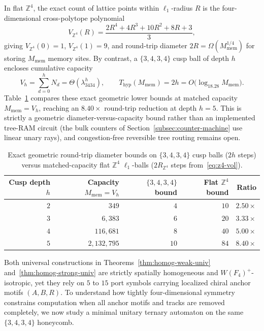 In flat $\mathbb{Z}^4$, the exact count of lattice points within $\ell_1$-radius $R$ is the four-dimensional cross-polytope polynomial
\begin{equation}
\label{eq:z4-vol}
V_{\mathbb{Z}^4}(R) = \frac{2R^4 + 4R^3 + 10R^2 + 8R + 3}{3},
\end{equation}
giving $V_{\mathbb{Z}^4}(0) = 1$, $V_{\mathbb{Z}^4}(1) = 9$, and round-trip diameter $2R = \Omega(M_{\mathrm{mem}}^{1/4})$ for storing $M_{\mathrm{mem}}$ memory sites. By contrast, a $\{3,4,3,4\}$ cusp ball of depth $h$ encloses cumulative capacity
\begin{equation}
\label{eq:cusp-cap}
V_h = \sum_{d=0}^{h} N_d = \Theta(\lambda_{3434}^{h}), \qquad T_{\mathrm{hyp}}(M_{\mathrm{mem}}) = 2h = O\bigl(\log_{18.28} M_{\mathrm{mem}}\bigr).
\end{equation}
Table~\ref{tab:ram-speedup} compares these exact geometric lower bounds at matched capacity $M_{\mathrm{mem}} = V_h$, reaching an $8.40\times$ round-trip reduction at depth $h = 5$. This is strictly a geometric diameter-versus-capacity bound rather than an implemented tree-RAM circuit (the bulk counters of Section~\ref{subsec:counter-machine} use linear unary rays), and congestion-free reversible tree routing remains open.

\begin{table}[tb]
\centering
\caption{Exact geometric round-trip diameter bounds on $\{3,4,3,4\}$ cusp balls ($2h$ steps) versus matched-capacity flat $\mathbb{Z}^4$ $\ell_1$-balls ($2R_{\mathbb{Z}^4}$ steps from~\eqref{eq:z4-vol}).}
\label{tab:ram-speedup}
\small
\begin{tabular}{@{}rrrrr@{}}
\toprule
Cusp depth $h$ & Capacity $M_{\mathrm{mem}} = V_h$ & $\{3,4,3,4\}$ bound & Flat $\mathbb{Z}^4$ bound & Ratio \\
\midrule
$2$ & $349$ & $4$ & $10$ & $2.50\times$ \\
$3$ & $6{,}383$ & $6$ & $20$ & $3.33\times$ \\
$4$ & $116{,}681$ & $8$ & $40$ & $5.00\times$ \\
$5$ & $2{,}132{,}795$ & $10$ & $84$ & $8.40\times$ \\
\bottomrule
\end{tabular}
\end{table}

Both universal constructions in Theorems~\ref{thm:homog-weak-univ} and~\ref{thm:homog-strong-univ} are strictly spatially homogeneous and $W(F_4)^+$-isotropic, yet they rely on $5$ to $15$ port symbols carrying localized chiral anchor motifs $(A, B, R)$. To understand how tightly four-dimensional symmetry constrains computation when all anchor motifs and tracks are removed completely, we now study a minimal unitary ternary automaton on the same $\{3,4,3,4\}$ honeycomb.
